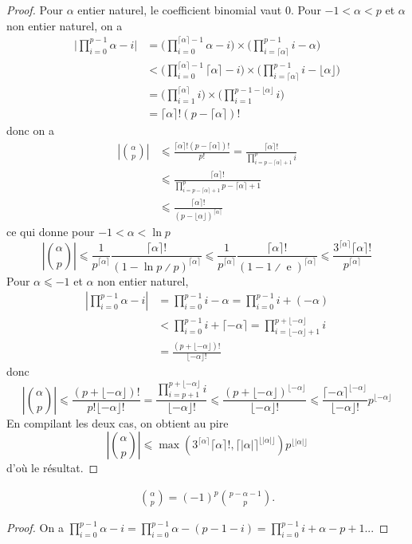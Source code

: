\begin{proof}
Pour \(𝛼\) entier naturel, le coefficient binomial vaut \(0\).
Pour \(-1<𝛼<𝑝\) et \(𝛼\) non entier naturel, on a
\begin{align*}
\biggl|∏_{𝑖=0}^{𝑝-1}𝛼-𝑖\biggr|
&{}=
\biggl(∏_{𝑖=0}^{⌈𝛼⌉-1}𝛼-𝑖\biggr)×
\biggl(∏_{𝑖=⌈𝛼⌉}^{𝑝-1}𝑖-𝛼\biggr)
\\&{}<
\biggl(∏_{𝑖=0}^{⌈𝛼⌉-1}⌈𝛼⌉-𝑖\biggr)×
\biggl(∏_{𝑖=⌈𝛼⌉}^{𝑝-1}𝑖-⌊𝛼⌋\biggr)
\\&{}=
\biggl(∏_{𝑖=1}^{⌈𝛼⌉}𝑖\biggr)×
\biggl(∏_{𝑖=1}^{𝑝-1-⌊𝛼⌋}𝑖\biggr)
\\&{}=⌈𝛼⌉!(𝑝-⌈𝛼⌉)!
\end{align*}
donc on a
\begin{align*}
\left|\binom{𝛼}{𝑝}\right|
&{}⩽
\frac{⌈𝛼⌉!(𝑝-⌈𝛼⌉)!}{𝑝!}=\frac{⌈𝛼⌉!}{∏_{𝑖=𝑝-⌈𝛼⌉+1}^{𝑝}𝑖}
\\&{}⩽
\frac{⌈𝛼⌉!}{∏_{𝑖=𝑝-⌈𝛼⌉+1}^{𝑝}𝑝-⌈𝛼⌉+1}
\\&{}⩽\frac{⌈𝛼⌉!}{(𝑝-⌊𝛼⌋)^{⌈𝛼⌉}}
\end{align*}
ce qui donne pour \(-1<𝛼<\ln 𝑝\)
\begin{equation*}
\left|\binom{𝛼}{𝑝}\right|⩽\frac 1{𝑝^{⌈𝛼⌉}}\frac{⌈𝛼⌉!}{(1-\ln 𝑝∕𝑝)^{⌈𝛼⌉}}⩽\frac
1{𝑝^{⌈𝛼⌉}}\frac{⌈𝛼⌉!}{(1-1∕\operatorname{e})^{⌈𝛼⌉}}⩽\frac{3^{⌈𝛼⌉}⌈𝛼⌉!}{𝑝^{⌈𝛼⌉}}
\end{equation*}
Pour \(𝛼⩽-1\) et \(𝛼\) non entier naturel,
\begin{align*}
\left|∏_{𝑖=0}^{𝑝-1}𝛼-𝑖\right|
&{}=
∏_{𝑖=0}^{𝑝-1}𝑖-𝛼=∏_{𝑖=0}^{𝑝-1}𝑖+(-𝛼)
\\&{}<∏_{𝑖=0}^{𝑝-1}𝑖+⌈-𝛼⌉=∏_{𝑖=⌊-𝛼⌋+1}^{𝑝+⌊-𝛼⌋}𝑖
\\&{}=\frac{(𝑝+⌊-𝛼⌋)!}{⌊-𝛼⌋!}
\end{align*}
donc
\begin{equation*}
\left|\binom{𝛼}{𝑝}\right|⩽\frac{(𝑝+⌊-𝛼⌋)!}{𝑝!⌊-𝛼⌋!}=\frac{∏_{𝑖=𝑝+1}^{𝑝+⌊-𝛼⌋}𝑖}{⌊-𝛼⌋!}⩽\frac{(𝑝+⌊-𝛼⌋)^{⌊-𝛼⌋}}{⌊-𝛼⌋!}⩽\frac{⌈-𝛼⌉^{⌊-𝛼⌋}}{⌊-𝛼⌋!}𝑝^{⌊-𝛼⌋}
\end{equation*}
En compilant les deux cas, on obtient au pire
\begin{equation*}
\left|\binom{𝛼}{𝑝}\right|⩽\operatorname{max}(3^{⌈𝛼⌉}⌈𝛼⌉!,⌈\left|𝛼\right|⌉^{⌊\left|𝛼\right|⌋})𝑝^{⌊\left|𝛼\right|⌋}
\end{equation*}
d'où le résultat.
\end{proof}
\begin{theorem}
\begin{gather*}
\binom{𝛼}{𝑝}=(-1)^{𝑝}\binom{𝑝-𝛼-1}{𝑝}.
\end{gather*}
\end{theorem}
\begin{proof}
On a \(∏_{𝑖=0}^{𝑝-1}𝛼-𝑖=∏_{𝑖=0}^{𝑝-1}𝛼-(𝑝-1-𝑖)=∏_{𝑖=0}^{𝑝-1}𝑖+𝛼-𝑝+1\)...
\end{proof}

